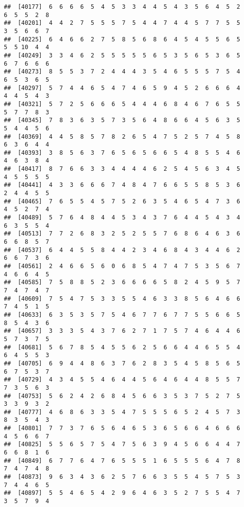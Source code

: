 \documentclass[
]{book}
\begin{document}
\begin{verbatim}
##  [40177]  6  6  6  6  5  4  5  3  3  4  4  5  4  3  5  6  4  5  2  6  5  5  2  8
##  [40201]  4  4  2  7  5  5  5  7  5  4  4  7  4  4  5  7  7  5  5  3  5  6  6  7
##  [40225]  6  4  6  6  2  7  5  8  5  6  8  6  4  5  4  5  5  6  5  5  5 10  4  4
##  [40249]  3  3  4  6  2  5  5  5  5  5  6  5  3  5  6  5  3  6  5  6  7  6  6  6
##  [40273]  8  5  5  3  7  2  4  4  4  3  5  4  6  5  5  5  7  5  4  6  5  3  6  5
##  [40297]  5  7  4  4  6  5  4  7  4  6  5  9  4  5  2  6  6  6  4  4  4  5  4  3
##  [40321]  5  7  2  5  6  6  6  5  4  4  4  6  8  4  6  7  6  5  5  5  7  7  8  3
##  [40345]  7  8  3  6  3  5  7  3  5  6  4  8  6  6  4  5  6  3  5  5  4  4  5  6
##  [40369]  4  4  5  8  5  7  8  2  6  5  4  7  5  2  5  7  4  5  8  6  3  6  4  4
##  [40393]  3  8  5  6  3  7  6  5  6  5  6  6  5  4  8  5  5  4  6  4  6  3  8  4
##  [40417]  8  7  6  6  3  3  4  4  4  4  6  2  5  4  5  6  3  4  5  4  5  5  5  5
##  [40441]  4  3  3  6  6  6  7  4  8  4  7  6  6  5  5  8  5  3  6  2  4  4  5  5
##  [40465]  7  6  5  5  4  5  7  5  2  6  3  5  4  6  5  4  7  3  6  4  5  2  7  4
##  [40489]  5  7  6  4  8  4  4  5  3  4  3  7  6  4  4  5  4  3  4  6  3  5  5  4
##  [40513]  7  7  2  6  8  3  2  5  2  5  5  7  6  8  6  4  6  3  6  6  6  8  5  7
##  [40537]  6  4  4  5  5  8  4  4  2  3  4  6  8  4  3  4  4  6  2  6  6  7  3  6
##  [40561]  2  4  6  6  5  6  0  6  8  5  4  7  4  7  5  3  5  6  7  4  6  6  4  5
##  [40585]  7  5  8  8  5  2  3  6  6  6  6  5  8  2  4  5  9  5  7  7  4  7  4  7
##  [40609]  7  5  4  7  5  3  3  5  5  4  6  3  3  8  5  6  4  6  6  7  4  5  1  5
##  [40633]  6  3  5  3  5  7  5  4  6  7  7  6  7  7  5  5  6  6  5  8  5  4  3  6
##  [40657]  3  3  3  5  4  3  7  6  2  7  1  7  5  7  4  6  4  4  6  5  7  3  7  5
##  [40681]  5  6  7  8  5  4  5  5  6  2  5  6  6  4  4  6  5  5  4  6  4  5  5  3
##  [40705]  6  9  4  4  8  6  3  7  6  2  8  3  5  4  5  8  5  6  5  6  7  5  3  7
##  [40729]  4  3  4  5  5  4  6  4  4  5  6  4  6  4  4  8  5  5  7  7  3  5  6  3
##  [40753]  5  6  2  4  2  6  8  4  5  6  6  3  5  3  7  5  2  7  5  3  3  9  3  2
##  [40777]  4  6  8  6  3  3  5  4  7  5  5  5  6  5  2  4  5  7  3  8  3  5  4  3
##  [40801]  7  7  3  7  6  5  6  4  6  5  3  6  5  6  6  4  6  6  6  4  5  6  6  7
##  [40825]  5  5  6  5  7  5  4  7  5  6  3  9  4  5  6  6  4  4  7  6  6  8  1  6
##  [40849]  6  7  7  6  4  7  6  5  5  5  1  6  5  5  5  6  4  7  8  7  4  7  4  8
##  [40873]  9  6  3  4  3  6  2  5  7  6  6  3  5  5  4  5  7  5  3  7  4  4  6  5
##  [40897]  5  5  4  6  5  4  2  9  6  4  6  3  5  2  7  5  5  4  7  3  5  7  9  4

\end{verbatim}
\end{document}
